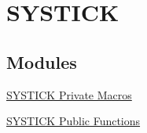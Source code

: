 \hypertarget{group___s_y_s_t_i_c_k}{\section{\-S\-Y\-S\-T\-I\-C\-K}
\label{group___s_y_s_t_i_c_k}
}
\subsection*{\-Modules}
\begin{DoxyCompactItemize}
\item 
\hyperlink{group___s_y_s_t_i_c_k___private___macros}{\-S\-Y\-S\-T\-I\-C\-K Private Macros}
\item 
\hyperlink{group___s_y_s_t_i_c_k___public___functions}{\-S\-Y\-S\-T\-I\-C\-K Public Functions}
\end{DoxyCompactItemize}
